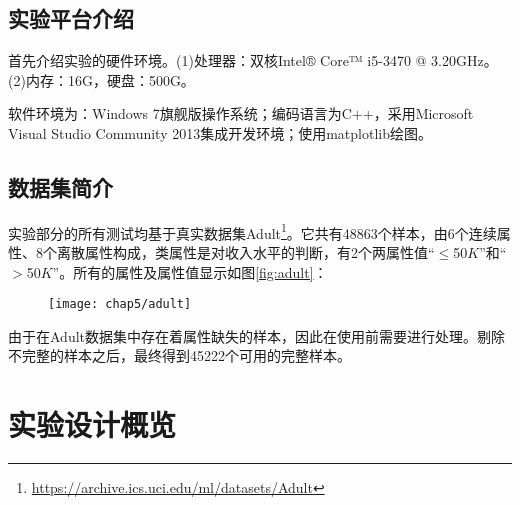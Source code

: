 \subsection{实验平台介绍}

首先介绍实验的硬件环境。(1)处理器：双核Intel® Core™ i5-3470 @ 3.20GHz。(2)内存：16G，硬盘：500G。

软件环境为：Windows 7旗舰版操作系统；编码语言为C++，采用Microsoft Visual Studio Community 2013集成开发环境；使用matplotlib绘图。

\subsection{数据集简介}

实验部分的所有测试均基于真实数据集Adult\footnote{\url{https://archive.ics.uci.edu/ml/datasets/Adult}}\supercite{adult}。它共有48863个样本，由6个连续属性、8个离散属性构成，类属性是对收入水平的判断，有2个两属性值“$\leqslant$50$K$”和“$>$50$K$”。所有的属性及属性值显示如图\ref{fig:adult}：

\begin{figure}[!htp]
	\centering
	\texttt{[image: chap5/adult]}
\end{figure}

由于在Adult数据集中存在着属性缺失的样本，因此在使用前需要进行处理。剔除不完整的样本之后，最终得到45222个可用的完整样本。

\section{实验设计概览}

